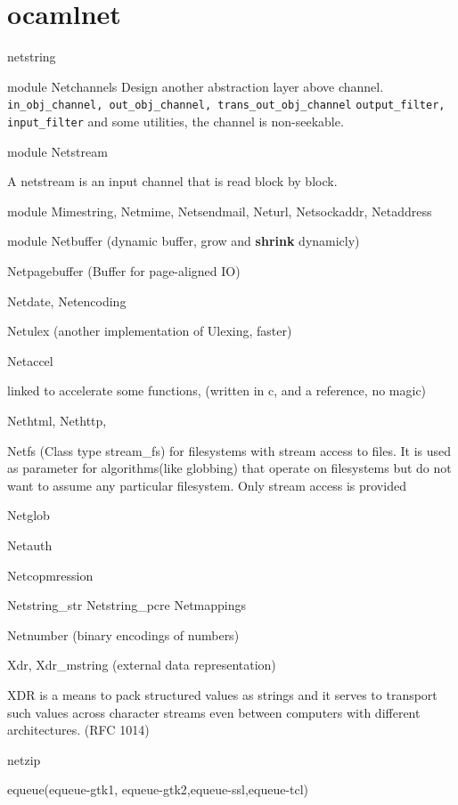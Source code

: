\section{ocamlnet}



netstring

\begin{enumerate}


module Netchannels
Design another abstraction layer above channel.
\verb|in_obj_channel, out_obj_channel, trans_out_obj_channel|
\verb|output_filter, input_filter|
and some utilities, the channel is non-seekable.

module Netstream 

A netstream is an input channel that is read block by block.

module Mimestring, Netmime, Netsendmail,  Neturl, Netsockaddr, 
Netaddress 


module Netbuffer (dynamic buffer, grow and \textbf{shrink} dynamicly)

Netpagebuffer (Buffer for page-aligned IO)

Netdate, Netencoding

Netulex (another implementation of Ulexing, faster)

Netaccel

linked to accelerate some functions, (written in c, and a reference,
no magic)


Nethtml, Nethttp, 


Netfs (Class type stream_fs) for filesystems with stream access to
files. It is used as parameter for algorithms(like globbing) that
operate on filesystems but do not want to assume any particular
filesystem. Only stream access is provided

Netglob

Netauth

Netcopmression

Netstring_str Netstring_pcre Netmappings

Netnumber (binary encodings of numbers)

Xdr, Xdr_mstring (external data representation)

XDR is a means to pack structured values as strings and it serves to
transport such values across character streams even between computers
with different architectures. (RFC 1014)
\end{enumerate}

netzip

equeue(equeue-gtk1, equeue-gtk2,equeue-ssl,equeue-tcl)

